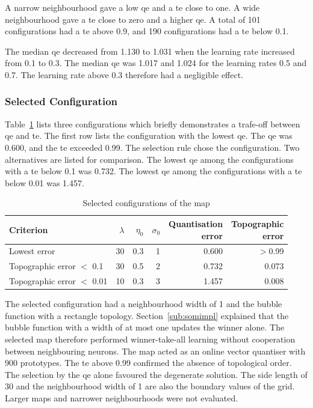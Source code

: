 \documentclass[conference]{IEEEtran}
\begin{document}
A narrow neighbourhood gave a low \gls{qe} and a \gls{te} close to one.
A wide neighbourhood gave a \gls{te} close to zero and a higher \gls{qe}.
A total of 101 configurations had a \gls{te} above 0.9, and 190 configurations had a \gls{te} below 0.1.

The median \gls{qe} decreased from 1.130 to 1.031 when the learning rate increased from 0.1 to 0.3.
The median \gls{qe} was 1.017 and 1.024 for the learning rates 0.5 and 0.7.
The learning rate above 0.3 therefore had a negligible effect.

\subsubsection{Selected Configuration}

Table~\ref{tab:selected} lists three configurations which briefly demonstrates a trafe-off between \gls{qe} and \gls{te}.
The first row lists the configuration with the lowest \gls{qe}.
The \gls{qe} was 0.600, and the \gls{te} exceeded 0.99.
The selection rule chose the configuration.
Two alternatives are listed for comparison.
The lowest \gls{qe} among the configurations with a \gls{te} below 0.1 was 0.732.
The lowest \gls{qe} among the configurations with a \gls{te} below 0.01 was 1.457.

\begin{table}[H]
\centering
\caption{Selected configurations of the map}
\label{tab:selected}
\footnotesize
\setlength{\tabcolsep}{3pt}
\begin{tabular}{lrrrrr}
\toprule
\textbf{Criterion} & $\lambda$ & $\eta_0$ & $\sigma_0$ & \shortstack{\textbf{Quantisation}\\\textbf{error}} & \shortstack{\textbf{Topographic}\\\textbf{error}} \\
\midrule
Lowest error & 30 & 0.3 & 1 & 0.600 & $>$0.99 \\
Topographic error $<$ 0.1 & 30 & 0.5 & 2 & 0.732 & 0.073 \\
Topographic error $<$ 0.01 & 10 & 0.3 & 3 & 1.457 & 0.008 \\
\bottomrule
\end{tabular}
\end{table}

The selected configuration had a neighbourhood width of 1 and the bubble function with a rectangle topology.
Section~\ref{sub:somimpl} explained that the bubble function with a width of at most one updates the winner alone.
The selected map therefore performed winner-take-all learning without cooperation between neighbouring neurons.
The map acted as an online vector quantiser with 900 prototypes.
The \gls{te} above 0.99 confirmed the absence of topological order.
The selection by the \gls{qe} alone favoured the degenerate solution.
The side length of 30 and the neighbourhood width of 1 are also the boundary values of the grid.
Larger maps and narrower neighbourhoods were not evaluated.
\end{document}
